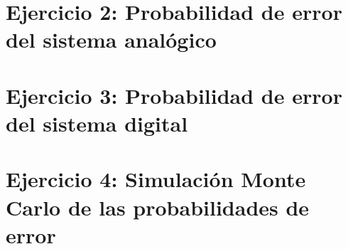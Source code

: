 \documentclass{article}
\begin{document}
\newpage
\section{Ejercicio 2: Probabilidad de error del sistema analógico}

\newpage
\section{Ejercicio 3: Probabilidad de error del sistema digital}

\newpage
\section{Ejercicio 4: Simulación Monte Carlo de las probabilidades de error}
\end{document}
